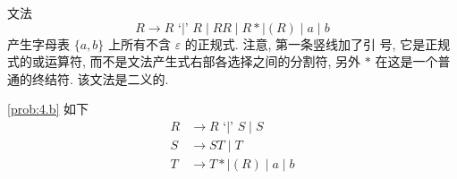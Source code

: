 \documentclass[boxes]{homework}
\begin{document}
\begin{problem}
文法
\begin{equation}
    R \to R \text{ `|' } R \mid R R \mid R* \mid (R) \mid a \mid b
\end{equation}
产生字母表 $\{a, b\}$ 上所有不含 $\varepsilon$ 的正规式. 注意, 第一条竖线加了引
号, 它是正规式的或运算符, 而不是文法产生式右部各选择之间的分割符, 另外 $*$
在这是一个普通的终结符. 该文法是二义的.
\end{problem}
\begin{solution}
    \ref{prob:4.b} 如下
    \begin{align}
        R & \to R \text{ `|' } S \mid S   \\
        S & \to ST \mid T                 \\
        T & \to T* \mid (R) \mid a \mid b
    \end{align}
\end{solution}
\end{document}
